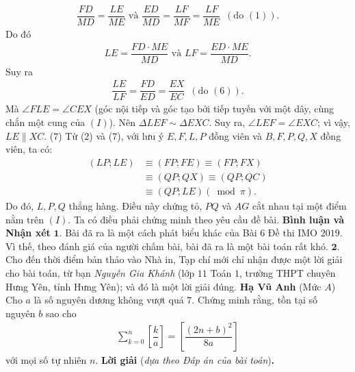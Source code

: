 \begin{multicols}{2}
\begin{align*}
		\dfrac{{FD}}{{MD}} \!=\! \dfrac{{LE}}{{ME}} \text{ và } \dfrac{{ED}}{{MD}} \!=\! \dfrac{{LF}}{{MF}} \!=\! \dfrac{{LF}}{{ME}}\,\,\,({\text{do }}(1)).
	\end{align*} 
	Do đó
	\begin{align*}
		LE = \dfrac{{FD \cdot ME}}{{MD}} \text{ và } LF = \dfrac{{ED \cdot ME}}{{MD}}.
	\end{align*}
	Suy ra
	\begin{align*}
		\dfrac{{LE}}{{LF}} = \dfrac{{FD}}{{ED}} = \dfrac{{EX}}{{EC}}\,\,\,({\text{do }}(6)).
	\end{align*}
	Mà $\angle FLE = \angle CEX$ (góc nội tiếp và góc tạo bởi tiếp tuyến với một dây, cùng chắn một cung của $(I)$).
	\vskip 0.05cm
	Nên $\Delta LEF \sim \Delta EXC$. Suy ra, $\angle LEF = \angle EXC$; vì vậy, $LE \parallel XC$. \hfill ($7$)
	\vskip 0.05cm
	Từ ($2$) và ($7$), với lưu ý $E, F, L, P$ đồng viên và $B, F, P, Q, X$ đồng viên, ta có:
	\begin{align*}
		\left( {LP;LE} \right) &\equiv \left( {FP;FE} \right) \equiv \left( {FP;FX} \right) \\[-0.5ex]
		&\equiv \left( {QP;QX} \right) \equiv \left( {QP;QC} \right) \\[-0.5ex]
		&\equiv \left( {QP;LE} \right)\left( {\bmod \pi } \right).
	\end{align*}
	Do đó, $L, P, Q$ thẳng hàng. Điều này chứng tỏ, $PQ$ và $AG$ cắt nhau tại một điểm nằm trên $(I)$.
	\vskip 0.05cm
	Ta có điều phải chứng minh theo yêu cầu đề bài.
	\vskip 0.05cm
	\textbf{\color{thachthuctoanhoc}Bình luận và Nhận xét}
	\vskip 0.05cm
	$\pmb{1.}$ Bài đã ra là một cách phát biểu khác của Bài $6$ Đề thi IMO $2019$. Vì thế, theo đánh giá của người chấm bài, bài đã ra là một bài toán rất khó.
	\vskip 0.05cm
	$\pmb{2.}$ Cho đến thời điểm bản thảo vào Nhà in, Tạp chí mới chỉ nhận được một lời giải cho bài toán, từ bạn \textit{Nguyễn Gia Khánh} (lớp $11$ Toán $1$, trường THPT chuyên Hưng Yên, tỉnh Hưng Yên); và đó là một lời giải đúng.
	\vskip 0.2cm
	\hfill	\textbf{\color{thachthuctoanhoc}Hạ Vũ Anh}
	\vskip 0.01cm
	\columnbreak
	{}
	(Mức $A$) Cho $a$ là số nguyên dương không vượt quá $7$. Chứng minh rằng, tồn tại số nguyên $b$ sao cho
	\begin{align*}
		\sum\limits_{k=0}^n\left[\dfrac ka\right]=\left[\dfrac {(2n+b)^2}{8a}\right]
	\end{align*}
	với mọi số tự nhiên $n$.
	\vskip 0.05cm
	\textbf{\color{thachthuctoanhoc}Lời giải} (\textit{dựa theo Đáp án của bài toán})\textbf{\color{thachthuctoanhoc}.}

\end{multicols}
